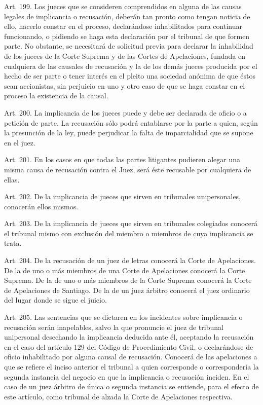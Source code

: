     Art. 199. Los jueces que se consideren comprendidos en alguna de las causas legales de implicancia o recusación, deberán tan pronto como tengan noticia de ello, hacerlo constar en el proceso, declarándose inhabilitados para continuar funcionando, o pidiendo se haga esta declaración por el tribunal de que formen parte.
    No obstante, se necesitará de solicitud previa para declarar la inhabilidad de los jueces de la Corte Suprema y de las Cortes de Apelaciones, fundada en cualquiera de las causales de recusación y la de los demás jueces producida por el hecho de ser parte o tener interés en el pleito una sociedad anónima de que éstos sean accionistas, sin perjuicio en uno y otro caso de que se haga constar en el proceso la existencia de la causal.


    Art. 200. La implicancia de los jueces puede y debe ser declarada de oficio o a petición de parte.
    La recusación sólo podrá entablarse por la parte a quien, según la presunción de la ley, puede perjudicar la falta de imparcialidad que se supone en el juez.

    Art. 201. En los casos en que todas las partes litigantes pudieren alegar una misma causa de recusación contra el Juez, será éste recusable por cualquiera de ellas.


    Art. 202. De la implicancia de jueces que sirven en tribunales unipersonales, conocerán ellos mismos.

    Art. 203. De la implicancia de jueces que sirven en tribunales colegiados conocerá el tribunal mismo con exclusión del miembro o miembros de cuya implicancia se trata.


    Art. 204. De la recusación de un juez de letras conocerá la Corte de Apelaciones.
    De la de uno o más miembros de una Corte de Apelaciones conocerá la Corte Suprema.
    De la de uno o más miembros de la Corte Suprema conocerá la Corte de Apelaciones de Santiago.
    De la de un juez árbitro conocerá el juez ordinario del lugar donde se sigue el juicio.



    Art. 205. Las sentencias que se dictaren en los incidentes sobre implicancia o recusación serán inapelables, salvo la que pronuncie el juez de tribunal unipersonal desechando la implicancia deducida ante él, aceptando la recusación en el caso del artículo 129 del Código de Procedimiento Civil, o declarándose de oficio inhabilitado por alguna causal de recusación.
    Conocerá de las apelaciones a que se refiere el inciso anterior el tribunal a quien corresponde o correspondería la segunda instancia del negocio en que la implicancia o recusación inciden.
    En el caso de un juez árbitro de única o segunda instancia se entiende, para el efecto de este artículo, como tribunal de alzada la Corte de Apelaciones respectiva.

